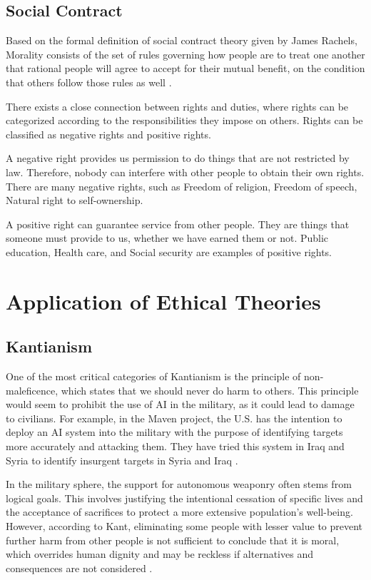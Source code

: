 \documentclass[12pt]{article}
\begin{document}
\subsection{Social Contract}
Based on the formal definition of social contract theory given by James Rachels, Morality consists of the set of rules governing how people are to treat one another that rational people will agree to accept for their mutual
benefit, on the condition that others follow those rules as well \cite{rachels-1986}. 

There exists a close connection between rights and duties, where rights can be categorized according to the responsibilities they impose on others. Rights can be classified as negative rights and positive rights. 

A negative right provides us permission to do things that are not restricted by law. Therefore, nobody can interfere with other people to obtain their own rights. There are many negative rights, such as Freedom of religion, Freedom of speech, Natural right to self-ownership.

A positive right can guarantee service from other people. They are things that someone must provide to us, whether we have earned them or not. Public education, Health care, and Social security are examples of positive rights.

\section{Application of Ethical Theories}
\subsection{Kantianism}
One of the most critical categories of Kantianism is the principle of non-maleficence, which states that we should never do harm to others. This principle would seem to prohibit the use of AI in the military, as it could lead to damage to civilians. For example, in the Maven project, the U.S. has the intention to deploy an AI system into the military with the purpose of identifying targets more accurately and attacking them. They have tried this system in Iraq and Syria to identify insurgent targets in Syria and Iraq \cite{AIinNS}. 

In the military sphere, the support for autonomous weaponry often stems from logical goals. This involves justifying the intentional cessation of specific lives and the acceptance of sacrifices to protect a more extensive population's well-being. However, according to Kant, eliminating some people with lesser value to prevent further harm from other people is not sufficient to conclude that it is moral, which overrides human dignity and may be reckless if alternatives and consequences are not considered \cite{KaninAI}.
\end{document}
